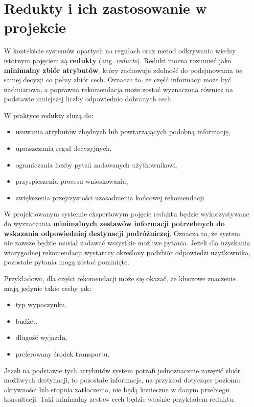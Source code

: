 \documentclass[12pt,a4paper]{article}
\begin{document}
\section{Redukty i ich zastosowanie w projekcie}

W kontekście systemów opartych na regułach oraz metod odkrywania wiedzy istotnym pojęciem są \textbf{redukty} (ang. \textit{reducts}). Redukt można rozumieć jako \textbf{minimalny zbiór atrybutów}, który zachowuje zdolność do podejmowania tej samej decyzji co pełny zbiór cech. Oznacza to, że część informacji może być nadmiarowa, a poprawna rekomendacja może zostać wyznaczona również na podstawie mniejszej liczby odpowiednio dobranych cech.

W praktyce redukty służą do:
\begin{itemize}
    \item usuwania atrybutów zbędnych lub powtarzających podobną informację,
    \item upraszczania reguł decyzyjnych,
    \item ograniczania liczby pytań zadawanych użytkownikowi,
    \item przyspieszenia procesu wnioskowania,
    \item zwiększenia przejrzystości uzasadnienia końcowej rekomendacji.
\end{itemize}

W projektowanym systemie ekspertowym pojęcie reduktu będzie wykorzystywane do wyznaczania \textbf{minimalnych zestawów informacji potrzebnych do wskazania odpowiedniej destynacji podróżniczej}. Oznacza to, że system nie zawsze będzie musiał zadawać wszystkie możliwe pytania. Jeżeli dla uzyskania wiarygodnej rekomendacji wystarczy określony podzbiór odpowiedzi użytkownika, pozostałe pytania mogą zostać pominięte.

Przykładowo, dla części rekomendacji może się okazać, że kluczowe znaczenie mają jedynie takie cechy jak:
\begin{itemize}
    \item typ wypoczynku,
    \item budżet,
    \item długość wyjazdu,
    \item preferowany środek transportu.
\end{itemize}

Jeżeli na podstawie tych atrybutów system potrafi jednoznacznie zawęzić zbiór możliwych destynacji, to pozostałe informacje, na przykład dotyczące poziomu aktywności lub stopnia zatłoczenia, nie będą konieczne w danym przebiegu konsultacji. Taki minimalny zestaw cech będzie właśnie przykładem reduktu.
\end{document}
